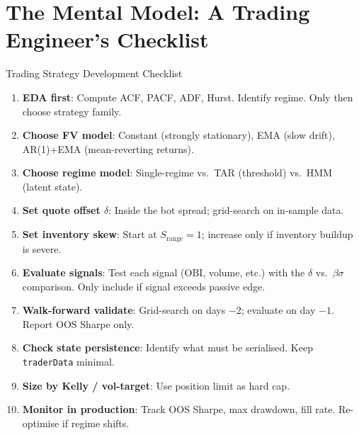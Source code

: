 \documentclass[12pt,a4paper,openany]{report}
\theoremstyle{definition}
\begin{document}
\section{The Mental Model: A Trading Engineer's Checklist}

\begin{keyconceptbox}{Trading Strategy Development Checklist}
\begin{enumerate}[label=\arabic*.]
  \item \textbf{EDA first}: Compute ACF, PACF, ADF, Hurst. Identify regime. Only then choose strategy family.
  \item \textbf{Choose FV model}: Constant (strongly stationary), EMA (slow drift), AR(1)+EMA (mean-reverting returns).
  \item \textbf{Choose regime model}: Single-regime vs.\ TAR (threshold) vs.\ HMM (latent state).
  \item \textbf{Set quote offset $\delta$}: Inside the bot spread; grid-search on in-sample data.
  \item \textbf{Set inventory skew}: Start at $S_{\text{range}} = 1$; increase only if inventory buildup is severe.
  \item \textbf{Evaluate signals}: Test each signal (OBI, volume, etc.) with the $\delta$ vs.\ $\beta\sigma$ comparison. Only include if signal exceeds passive edge.
  \item \textbf{Walk-forward validate}: Grid-search on days $-2$; evaluate on day $-1$. Report OOS Sharpe only.
  \item \textbf{Check state persistence}: Identify what must be serialised. Keep \texttt{traderData} minimal.
  \item \textbf{Size by Kelly / vol-target}: Use position limit as hard cap.
  \item \textbf{Monitor in production}: Track OOS Sharpe, max drawdown, fill rate. Re-optimise if regime shifts.
\end{enumerate}
\end{keyconceptbox}
\end{document}
